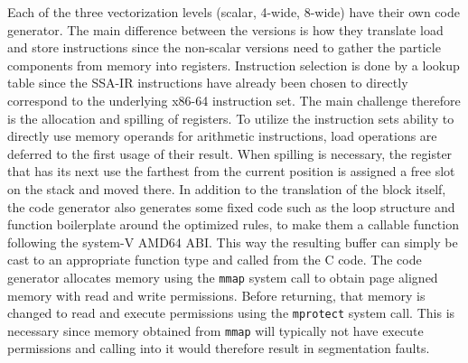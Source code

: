 Each of the three vectorization levels (scalar, 4-wide, 8-wide) have their own code generator. The main difference between the versions is how they translate load and store instructions since the non-scalar versions need to gather the particle components from memory into registers. Instruction selection is done by a lookup table since the SSA-IR instructions have already been chosen to directly correspond to the underlying x86-64 instruction set. The main challenge therefore is the allocation and spilling of registers. To utilize the instruction sets ability to directly use memory operands for arithmetic instructions, load operations are deferred to the first usage of their result. When spilling is necessary, the register that has its next use the farthest from the current position is assigned a free slot on the stack and moved there. In addition to the translation of the block itself, the code generator also generates some fixed code such as the loop structure and function boilerplate around the optimized rules, to make them a callable function following the system-V AMD64 ABI. This way the resulting buffer can simply be cast to an appropriate function type and called from the C code. The code generator allocates memory using the \texttt{mmap} system call to obtain page aligned memory with read and write permissions. Before returning, that memory is changed to read and execute permissions using the \texttt{mprotect} system call. This is necessary since memory obtained from \texttt{mmap} will typically not have execute permissions and calling into it would therefore result in segmentation faults.
